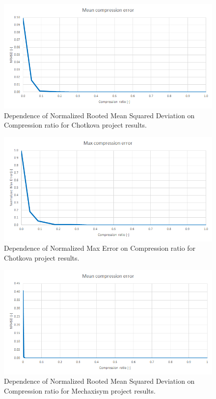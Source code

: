 \begin{figure}[ht]
\centering\includegraphics[width=\textwidth]{figures/chotkova_NRMSD}
\caption{Dependence of Normalized Rooted Mean Squared Deviation on Compression ratio for Chotkova project results.}
\label{fig:chotkova:NRMSD}
\end{figure}

\begin{figure}[ht]
\centering\includegraphics[width=\textwidth]{figures/chotkova_MaxError}
\caption{Dependence of Normalized Max Error on Compression ratio for Chotkova project results.}
\label{fig:chotkova:MaxError}
\end{figure}

\begin{figure}[ht]
\centering\includegraphics[width=\textwidth]{figures/mechaxisym_NRMSD}
\caption{Dependence of Normalized Rooted Mean Squared Deviation on Compression ratio for Mechaxisym project results.}
\label{fig:mechaxisym:NRMSD}
\end{figure}


